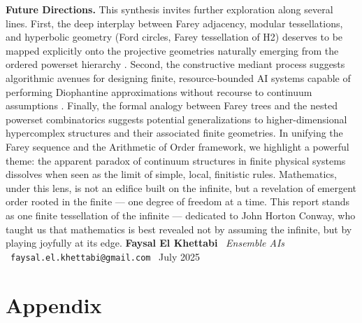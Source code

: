 \documentclass[12pt,a4paper]{article}
\theoremstyle{definition}
\theoremstyle{remark}
\begin{document}
\textbf{Future Directions.} This synthesis invites further exploration along several lines. First, the deep interplay between Farey adjacency, modular tessellations, and hyperbolic geometry (Ford circles, Farey tessellation of H2) deserves to be mapped explicitly onto the projective geometries naturally emerging from the ordered powerset hierarchy \cite{ElKhettabi2025AoO, WikipediaFarey, FareyGraphSymmetry}. Second, the constructive mediant process suggests algorithmic avenues for designing finite, resource-bounded AI systems capable of performing Diophantine approximations without recourse to continuum assumptions \cite{ElKhettabi2025AoO, WikipediaSternBrocot}. Finally, the formal analogy between Farey trees and the nested powerset combinatorics suggests potential generalizations to higher-dimensional hypercomplex structures and their associated finite geometries.
In unifying the Farey sequence and the Arithmetic of Order framework, we highlight a powerful theme: the apparent paradox of continuum structures in finite physical systems dissolves when seen as the limit of simple, local, finitistic rules. Mathematics, under this lens, is not an edifice built on the infinite, but a revelation of emergent order rooted in the finite --- one degree of freedom at a time. This report stands as one finite tessellation of the infinite --- dedicated to John Horton Conway, who taught us that mathematics is best revealed not by assuming the infinite, but by playing joyfully at its edge.
\vspace{1em}
\noindent
\textbf{Faysal El Khettabi} \
\emph{Ensemble AIs} \
\texttt{faysal.el.khettabi@gmail.com} \
July 2025
\appendix
\section{Appendix}
\end{document}
